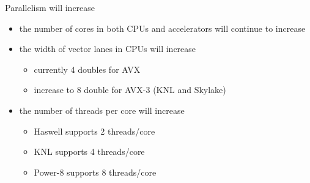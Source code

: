 \documentclass[aspectratio=43]{beamer}
\begin{document}
\begin{frame}[fragile]{}
    \begin{info}{Parallelism will increase}
        \begin{itemize}
            \item the number of cores in both CPUs and accelerators will continue to increase
            \item the width of vector lanes in CPUs will increase
            \begin{itemize}
                \item currently 4 doubles for AVX
                \item increase to 8 double for AVX-3 (KNL and Skylake)
            \end{itemize}
            \item the number of threads per core will increase
            \begin{itemize}
                \item Haswell supports 2 threads/core
                \item KNL supports 4 threads/core
                \item Power-8 supports 8 threads/core
            \end{itemize}
        \end{itemize}
    \end{info}
\end{frame}
\end{document}
